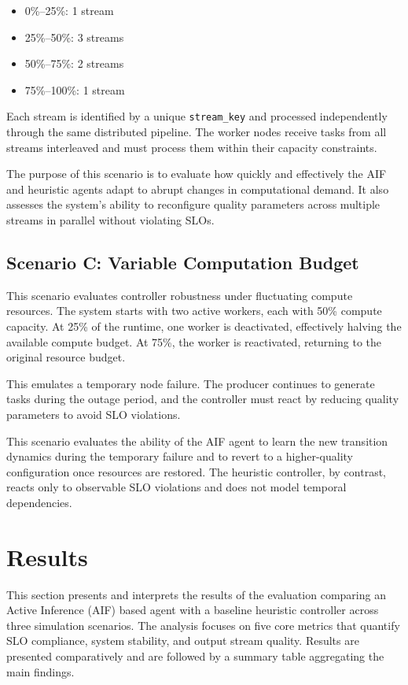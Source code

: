 \begin{itemize}
    \item 0\%–25\%: 1 stream
    \item 25\%–50\%: 3 streams
    \item 50\%–75\%: 2 streams
    \item 75\%–100\%: 1 stream
\end{itemize}

Each stream is identified by a unique \texttt{stream\_key} and processed independently through the same distributed pipeline. The worker nodes receive tasks from all streams interleaved and must process them within their capacity constraints.

The purpose of this scenario is to evaluate how quickly and effectively the AIF and heuristic agents adapt to abrupt changes in computational demand. It also assesses the system’s ability to reconfigure quality parameters across multiple streams in parallel without violating SLOs.

\subsection{Scenario C: Variable Computation Budget}
\label{sec:evaluation-variable-budget}

This scenario evaluates controller robustness under fluctuating compute resources. The system starts with two active workers, each with 50\% compute capacity. At 25\% of the runtime, one worker is deactivated, effectively halving the available compute budget. At 75\%, the worker is reactivated, returning to the original resource budget.

This emulates a temporary node failure. The producer continues to generate tasks during the outage period, and the controller must react by reducing quality parameters to avoid SLO violations.

This scenario evaluates the ability of the AIF agent to learn the new transition dynamics during the temporary failure and to revert to a higher-quality configuration once resources are restored. The heuristic controller, by contrast, reacts only to observable SLO violations and does not model temporal dependencies.

\section{Results}

This section presents and interprets the results of the evaluation comparing an Active Inference (AIF) based agent with a baseline heuristic controller across three simulation scenarios. The analysis focuses on five core metrics that quantify SLO compliance, system stability, and output stream quality. Results are presented comparatively and are followed by a summary table aggregating the main findings.

